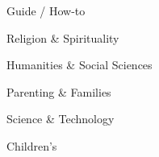 \begin{CompactItemize}
\begin{CompactItemize}
\begin{CompactItemize}
\begin{CompactItemize}
\begin{CompactItemize}
\begin{CompactItemize}
                        \item Guide / How-to
                        \item Religion \& Spirituality
                        \item Humanities \& Social Sciences
                        \item Parenting \& Families
                        \item Science \& Technology
                        \item Children's
                    \end{CompactItemize}
                \end{CompactItemize}
            \end{CompactItemize}
        \end{CompactItemize}
    \end{CompactItemize}
\end{CompactItemize}
